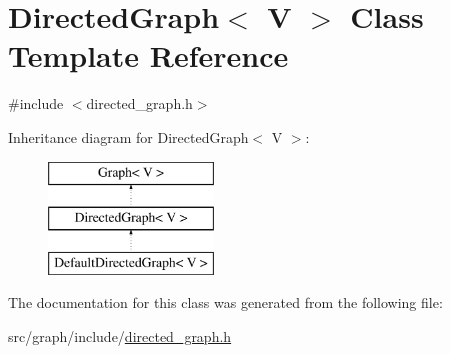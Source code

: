 \hypertarget{classDirectedGraph}{}\section{Directed\+Graph$<$ V $>$ Class Template Reference}
\label{classDirectedGraph}


{\ttfamily \#include $<$directed\+\_\+graph.\+h$>$}

Inheritance diagram for Directed\+Graph$<$ V $>$\+:\begin{figure}[H]
\begin{center}
\leavevmode
\includegraphics[height=3.000000cm]{classDirectedGraph}
\end{center}
\end{figure}


The documentation for this class was generated from the following file\+:\begin{DoxyCompactItemize}
\item 
src/graph/include/\hyperlink{directed__graph_8h}{directed\+\_\+graph.\+h}\end{DoxyCompactItemize}
